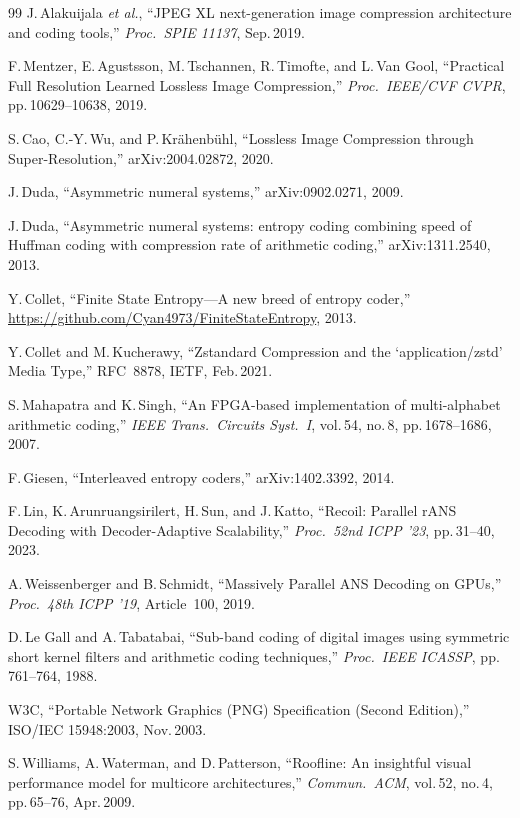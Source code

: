 \documentclass[journal]{IEEEtran}
\begin{document}
\begin{thebibliography}{99}
J.\,Alakuijala \textit{et al.},
``JPEG XL next-generation image compression architecture and coding tools,''
\textit{Proc.\ SPIE 11137}, Sep.\,2019.

F.\,Mentzer, E.\,Agustsson, M.\,Tschannen, R.\,Timofte, and L.\,Van Gool,
``Practical Full Resolution Learned Lossless Image Compression,''
\textit{Proc.\ IEEE/CVF CVPR}, pp.\,10629--10638, 2019.

S.\,Cao, C.-Y.\,Wu, and P.\,Kr\"ahenb\"uhl,
``Lossless Image Compression through Super-Resolution,''
arXiv:2004.02872, 2020.

J.\,Duda, ``Asymmetric numeral systems,'' arXiv:0902.0271, 2009.

J.\,Duda, ``Asymmetric numeral systems: entropy coding combining speed of
Huffman coding with compression rate of arithmetic coding,''
arXiv:1311.2540, 2013.

Y.\,Collet, ``Finite State Entropy---A new breed of entropy coder,''
\url{https://github.com/Cyan4973/FiniteStateEntropy}, 2013.

Y.\,Collet and M.\,Kucherawy,
``Zstandard Compression and the `application/zstd' Media Type,''
RFC~8878, IETF, Feb.\,2021.

S.\,Mahapatra and K.\,Singh,
``An FPGA-based implementation of multi-alphabet arithmetic coding,''
\textit{IEEE Trans.\ Circuits Syst.\ I}, vol.\,54, no.\,8, pp.\,1678--1686,
2007.

F.\,Giesen, ``Interleaved entropy coders,'' arXiv:1402.3392, 2014.

F.\,Lin, K.\,Arunruangsirilert, H.\,Sun, and J.\,Katto,
``Recoil: Parallel rANS Decoding with Decoder-Adaptive Scalability,''
\textit{Proc.\ 52nd ICPP '23}, pp.\,31--40, 2023.

A.\,Weissenberger and B.\,Schmidt,
``Massively Parallel ANS Decoding on GPUs,''
\textit{Proc.\ 48th ICPP '19}, Article~100, 2019.

D.\,Le Gall and A.\,Tabatabai,
``Sub-band coding of digital images using symmetric short kernel filters and
arithmetic coding techniques,'' \textit{Proc.\ IEEE ICASSP}, pp.\,761--764,
1988.

W3C, ``Portable Network Graphics (PNG) Specification (Second Edition),''
ISO/IEC 15948:2003, Nov.\,2003.

S.\,Williams, A.\,Waterman, and D.\,Patterson,
``Roofline: An insightful visual performance model for multicore
architectures,''
\textit{Commun.\ ACM}, vol.\,52, no.\,4, pp.\,65--76, Apr.\,2009.


\end{thebibliography}
\end{document}
